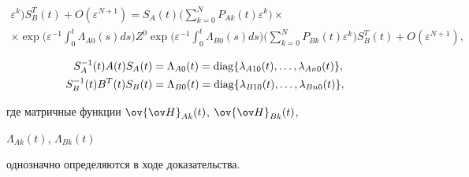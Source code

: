 \begin{thm}
\begin{multline}
\varepsilon^k\bigg)S^T_B(t)+O(\varepsilon^{N+1})=S_A(t)\bigg( 


\sum^N_{k=0} P_{Ak}(t)\varepsilon^k\bigg)\times \\ 


% 


\times\exp\bigg(\varepsilon^{-1}\int^t_0 \Lambda_{A0}(s)ds\bigg)Z^0\exp\bigg( 


\varepsilon^{-1}\int^t_0\Lambda_{B0}(s)ds\bigg)\bigg(\sum^N_{k=0} 


P_{Bk}(t)\varepsilon^k\bigg)S^T_B(t)+O(\varepsilon^{N+1}), 


\end{multline} 


\begin{align*} 


S^{-1}_A(t)A(t)S_A(t)&=\Lambda_{A0}(t)=\diag 


\{\lambda_{A10}(t),\dotsc,\lambda_{An0}(t)\},\\ 


S^{-1}_B(t)B^T(t)S_B(t)&=\Lambda_{B0}(t)=\diag 


\{\lambda_{B10}(t),\dotsc,\lambda_{Bn0}(t)\}, 


\end{align*} 


где матричные функции $\ov{\ov H}_{Ak}(t)$, $\ov{\ov H}_{Bk}(t)$, 


$\Lambda_{Ak}(t)$, $\Lambda_{Bk}(t)$ 


однозначно определяются в ходе доказательства. 


\end{thm} 


 


 



